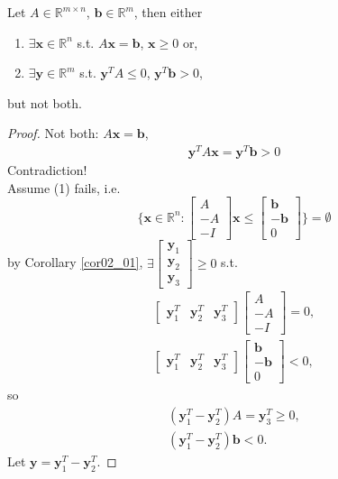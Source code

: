 \documentclass[a4paper,12pt]{amsart}
\newcommand{\RR}{\mathbb{R}}
\newcommand{\bfx}{\mathbf{x}}
\newcommand{\bfy}{\mathbf{y}}
\newcommand{\bfb}{\mathbf{b}}
\begin{document}
\begin{Corollary}
Let $A\in\RR^{m\times n}$, $\bfb\in \RR^m$, then either
\begin{enumerate}
\item $\exists \bfx\in\RR^n$ s.t. $A\bfx= \bfb$, $\bfx\geq 0$ or,
\item $\exists \bfy\in\RR^m$ s.t. $\bfy^TA\leq 0$, $\bfy^T\bfb> 0$,
\end{enumerate}
but not both.
\end{Corollary}
\begin{proof}
Not both: $A\bfx=\bfb$,
\begin{align*}
\bfy^TA\bfx=\bfy^T\bfb>0
\end{align*}
Contradiction!\\
Assume (1) fails, i.e.
\begin{equation*}
\{\bfx\in\RR^n:\begin{bmatrix}
A\\-A\\-I
\end{bmatrix}\bfx\leq\begin{bmatrix}
\bfb\\-\bfb\\0
\end{bmatrix}\}=\emptyset
\end{equation*}
by Corollary \ref{cor02_01}, $\exists \begin{bmatrix}
\bfy_1\\ \bfy_2\\ \bfy_3
\end{bmatrix}\geq 0$ s.t.
\begin{align*}
\begin{bmatrix}
\bfy_1^T& \bfy_2^T& \bfy_3^T
\end{bmatrix}\begin{bmatrix}
A\\-A\\-I
\end{bmatrix}=0,\\
\begin{bmatrix}
\bfy_1^T& \bfy_2^T& \bfy_3^T
\end{bmatrix}\begin{bmatrix}
\bfb\\-\bfb\\0
\end{bmatrix}<0,
\end{align*}
so
\begin{align*}
(\bfy_1^T-\bfy_2^T)A=\bfy_3^T\geq 0,\\
(\bfy_1^T-\bfy_2^T)\bfb< 0.
\end{align*}
Let $\bfy=\bfy_1^T-\bfy_2^T$.
\end{proof}
\end{document}
